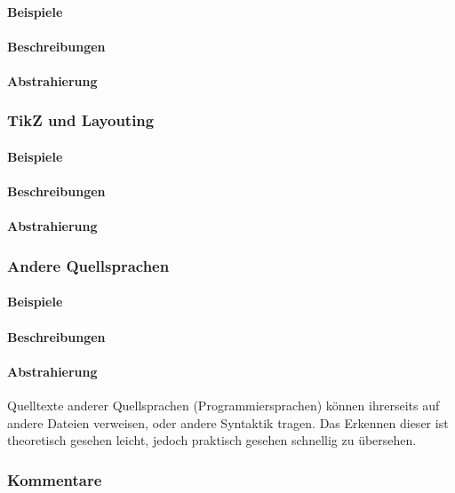 \paragraph*{Beispiele}
\paragraph*{Beschreibungen}
\paragraph*{Abstrahierung}

\subsubsection{TikZ und Layouting}\label{problems:advanced:layouting}
\paragraph*{Beispiele}
\paragraph*{Beschreibungen}
\paragraph*{Abstrahierung}

\subsubsection{Andere Quellsprachen}\label{problems:special:sourcecode}
\paragraph*{Beispiele}
\paragraph*{Beschreibungen}
\paragraph*{Abstrahierung}
Quelltexte anderer Quellsprachen (Programmiersprachen) können ihrerseits auf andere Dateien verweisen, oder andere Syntaktik tragen. Das Erkennen dieser ist theoretisch gesehen leicht, jedoch praktisch gesehen schnellig zu übersehen. 

\subsubsection{Kommentare}\label{problems:special:comments}
